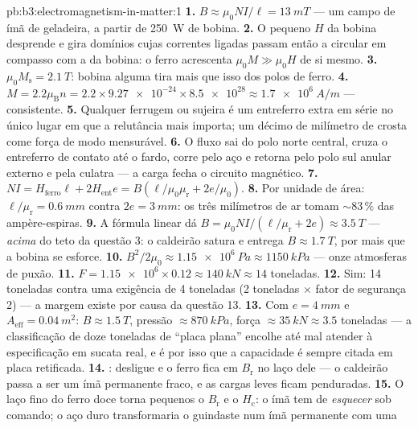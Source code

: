 \begin{solution}{pb:b3:electromagnetism-in-matter:1}
\textbf{1.} $B \approx \mu_0NI/\ell = \qty{13}{mT}$ --- um campo de
ímã de geladeira, a partir de \qty{250}{W} de bobina.
\textbf{2.} O pequeno $H$ da bobina desprende e gira domínios cujas
correntes ligadas passam então a circular em compasso com a da bobina: o
ferro acrescenta $\mu_0M \gg \mu_0H$ de si mesmo.
\textbf{3.} $\mu_0M_{\text{s}} = \qty{2.1}{T}$: bobina alguma tira
mais que isso dos polos de ferro.
\textbf{4.} $M = 2.2\mu_{\text{B}}n = 2.2\times\num{9.27e-24}
\times\num{8.5e28} \approx \qty{1.7e6}{A/m}$ --- consistente.
\textbf{5.} Qualquer ferrugem ou sujeira é um entreferro extra em série
no único lugar em que a relutância mais importa; um décimo de milímetro
de crosta come força de modo mensurável.
\textbf{6.} O fluxo sai do polo norte central, cruza o entreferro de
contato até o fardo, corre pelo aço e retorna
pelo polo sul anular externo e pela culatra --- a carga
fecha o circuito magnético.
\textbf{7.} $NI = H_{\text{ferro}}\ell + 2H_{\text{ent}}e =
B(\ell/\mu_0\mu_{\text{r}} + 2e/\mu_0)$.
\textbf{8.} Por unidade de área: $\ell/\mu_{\text{r}} = \qty{0.6}{mm}$
contra $2e = \qty{3}{mm}$: os três milímetros de ar tomam
$\sim83\,\%$ das ampère-espiras.
\textbf{9.} A fórmula linear dá $B = \mu_0NI/(\ell/
\mu_{\text{r}} + 2e) \approx \qty{3.5}{T}$ --- \emph{acima} do
teto da questão 3: o caldeirão satura e entrega $B \approx
\qty{1.7}{T}$, por mais que a bobina se esforce.
\textbf{10.} $B^2/2\mu_0 \approx \qty{1.15e6}{Pa} \approx
\qty{1150}{kPa}$ --- onze atmosferas de puxão.
\textbf{11.} $F = \num{1.15e6}\times0.12 \approx \qty{140}{kN}
\approx 14$ toneladas.
\textbf{12.} Sim: 14 toneladas contra uma exigência de 4 toneladas
(2 toneladas $\times$ fator de segurança 2) --- a margem existe por
causa da questão 13.
\textbf{13.} Com $e = \qty{4}{mm}$ e $A_{\text{eff}} =
\qty{0.04}{m^2}$: $B \approx \qty{1.5}{T}$, pressão
$\approx\qty{870}{kPa}$, força $\approx\qty{35}{kN} \approx 3.5$
toneladas --- a classificação de doze toneladas de ``placa plana''
encolhe até mal atender à especificação em sucata real, e é por isso que
a capacidade é sempre citada em placa retificada.
\textbf{14.} : desligue e o ferro fica em
$B_{\text{r}}$ no laço dele --- o caldeirão passa a ser um ímã
permanente fraco, e as cargas leves ficam penduradas.
\textbf{15.} O laço fino do ferro doce torna pequenos o $B_{\text{r}}$ e o
$H_{\text{c}}$: o ímã tem de \emph{esquecer} sob comando;
o aço duro transformaria o guindaste num ímã permanente com uma

\end{solution}
